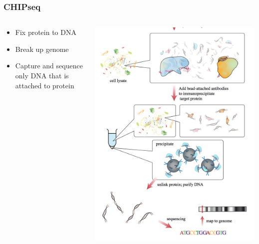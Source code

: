 \documentclass[14pt]{beamer}
\begin{document}
\begin{frame}
\frametitle{CHIPseq}
\begin{columns}
	\begin{column}{0.6\textwidth}
		\begin{itemize}
			\item<+-> Fix protein to DNA
			\item<+-> Break up genome
			\item<+-> Capture and sequence only DNA that is attached to protein
		\end{itemize}
		\end{column}
	\begin{column}{0.4\textwidth}
		\begin{center}
     		\includegraphics[width=1\textwidth]{images_20170926_CHIP.png}
     	\end{center}
	\end{column}
\end{columns}
\end{frame}
\end{document}
